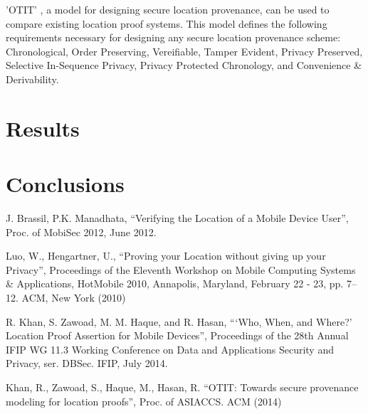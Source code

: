 \documentclass[12pt]{article}
\begin{document}
'OTIT' \cite{otit}, a model for designing secure location provenance, can be used to compare existing location proof systems. This model defines the following requirements necessary for designing any secure location provenance scheme: Chronological, Order Preserving, Vereifiable, Tamper Evident, Privacy Preserved, Selective In-Sequence Privacy, Privacy Protected Chronology, and Convenience \& Derivability.

\section{Results}

\section{Conclusions}

\begin{thebibliography}{9}

  J. Brassil, P.K. Manadhata,
  ``Verifying the Location of a Mobile Device User'',
  Proc. of MobiSec 2012,
  June 2012.

  Luo, W., Hengartner, U.,
  ``Proving your Location without giving up your Privacy'',
  Proceedings of the Eleventh Workshop on Mobile Computing Systems \& Applications,
  HotMobile 2010, Annapolis, Maryland, February 22 - 23, pp. 7–12. ACM,
  New York (2010)

  R. Khan, S. Zawoad, M. M. Haque, and R. Hasan,
  ```Who, When, and Where?' Location Proof Assertion for Mobile Devices'',
  Proceedings of the 28th Annual IFIP WG 11.3 Working Conference on Data and Applications Security and Privacy, ser. DBSec. IFIP,
  July 2014.
 
  Khan, R., Zawoad, S., Haque, M., Hasan, R.
  ``OTIT: Towards secure provenance modeling for location proofs'',
  Proc. of ASIACCS. ACM (2014)

\end{thebibliography}
\end{document}
